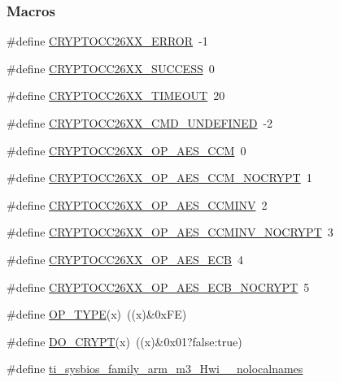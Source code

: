 \subsubsection*{Macros}
\begin{DoxyCompactItemize}
\item 
\#define \hyperlink{_crypto_c_c26_x_x_8h_ae56a5165f1674a8a78b77c45ff7d7a5c}{C\-R\-Y\-P\-T\-O\-C\-C26\-X\-X\-\_\-\-E\-R\-R\-O\-R}~-\/1
\item 
\#define \hyperlink{_crypto_c_c26_x_x_8h_a4a3c0f76b7172c6fdbc493fcafd5bf82}{C\-R\-Y\-P\-T\-O\-C\-C26\-X\-X\-\_\-\-S\-U\-C\-C\-E\-S\-S}~0
\item 
\#define \hyperlink{_crypto_c_c26_x_x_8h_a8a94999f3768d815e26ac50a0debeeb0}{C\-R\-Y\-P\-T\-O\-C\-C26\-X\-X\-\_\-\-T\-I\-M\-E\-O\-U\-T}~20
\item 
\#define \hyperlink{_crypto_c_c26_x_x_8h_acb53bef0cea3a06a3563e728bcb5665d}{C\-R\-Y\-P\-T\-O\-C\-C26\-X\-X\-\_\-\-C\-M\-D\-\_\-\-U\-N\-D\-E\-F\-I\-N\-E\-D}~-\/2
\item 
\#define \hyperlink{_crypto_c_c26_x_x_8h_a6ab0b59b64c06856c431f91a7e43b34d}{C\-R\-Y\-P\-T\-O\-C\-C26\-X\-X\-\_\-\-O\-P\-\_\-\-A\-E\-S\-\_\-\-C\-C\-M}~0
\item 
\#define \hyperlink{_crypto_c_c26_x_x_8h_acc1c159d62112b90da86ecd846994f98}{C\-R\-Y\-P\-T\-O\-C\-C26\-X\-X\-\_\-\-O\-P\-\_\-\-A\-E\-S\-\_\-\-C\-C\-M\-\_\-\-N\-O\-C\-R\-Y\-P\-T}~1
\item 
\#define \hyperlink{_crypto_c_c26_x_x_8h_a38c8bce4f77947e99d2d877e8d3dee7e}{C\-R\-Y\-P\-T\-O\-C\-C26\-X\-X\-\_\-\-O\-P\-\_\-\-A\-E\-S\-\_\-\-C\-C\-M\-I\-N\-V}~2
\item 
\#define \hyperlink{_crypto_c_c26_x_x_8h_a445002cd50ecda94d48f437bc213a499}{C\-R\-Y\-P\-T\-O\-C\-C26\-X\-X\-\_\-\-O\-P\-\_\-\-A\-E\-S\-\_\-\-C\-C\-M\-I\-N\-V\-\_\-\-N\-O\-C\-R\-Y\-P\-T}~3
\item 
\#define \hyperlink{_crypto_c_c26_x_x_8h_a9e96510f981e65f0c46c19684daaff07}{C\-R\-Y\-P\-T\-O\-C\-C26\-X\-X\-\_\-\-O\-P\-\_\-\-A\-E\-S\-\_\-\-E\-C\-B}~4
\item 
\#define \hyperlink{_crypto_c_c26_x_x_8h_aea29a252e094057f90d0fccd938b8a0d}{C\-R\-Y\-P\-T\-O\-C\-C26\-X\-X\-\_\-\-O\-P\-\_\-\-A\-E\-S\-\_\-\-E\-C\-B\-\_\-\-N\-O\-C\-R\-Y\-P\-T}~5
\item 
\#define \hyperlink{_crypto_c_c26_x_x_8h_ab17446955616908dd2c48c2ca50ceb63}{O\-P\-\_\-\-T\-Y\-P\-E}(x)~((x)\&0x\-F\-E)
\item 
\#define \hyperlink{_crypto_c_c26_x_x_8h_ac6c19e9fb605c1240013a59e8d15f21d}{D\-O\-\_\-\-C\-R\-Y\-P\-T}(x)~((x)\&0x01?false\-:true)
\item 
\#define \hyperlink{_crypto_c_c26_x_x_8h_aaa17ecf48f5762e2e1bdb0bab8aacf0c}{ti\-\_\-sysbios\-\_\-family\-\_\-arm\-\_\-m3\-\_\-\-Hwi\-\_\-\-\_\-nolocalnames}
\end{DoxyCompactItemize}
